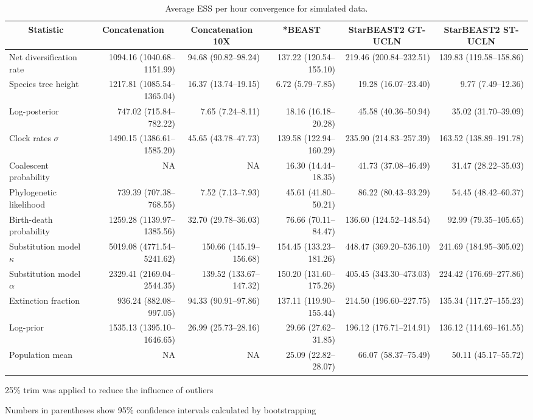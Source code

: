 \documentclass[12pt]{article}
\begin{document}
\begin{landscape}
\begin{table}[htb!]
\centering
\caption{Average ESS per hour convergence for simulated data.}
\label{tab:simulatedPerHour}
\begin{threeparttable}
\begin{adjustbox}{center}
\renewcommand{\arraystretch}{1.2}
\scriptsize
\begin{tabular}{|l|r|r|r|r|r|}
\multicolumn{1}{c}{Statistic} & \multicolumn{1}{c}{Concatenation} & \multicolumn{1}{c}{Concatenation 10X} & \multicolumn{1}{c}{*BEAST} & \multicolumn{1}{c}{StarBEAST2 GT-UCLN} & \multicolumn{1}{c}{StarBEAST2 ST-UCLN}\tabularnewline
\hline
Net diversification rate & 1094.16 (1040.68--1151.99) & 94.68 (90.82--98.24) & 137.22 (120.54--155.10) & 219.46 (200.84--232.51) & 139.83 (119.58--158.86)\tabularnewline
\hline
Species tree height & 1217.81 (1085.54--1365.04) & 16.37 (13.74--19.15) & 6.72 (5.79--7.85) & 19.28 (16.07--23.40) & 9.77 (7.49--12.36)\tabularnewline
\hline
Log-posterior & 747.02 (715.84--782.22) & 7.65 (7.24--8.11) & 18.16 (16.18--20.28) & 45.58 (40.36--50.94) & 35.02 (31.70--39.09)\tabularnewline
\hline
Clock rates $\sigma$ & 1490.15 (1386.61--1585.20) & 45.65 (43.78--47.73) & 139.58 (122.94--160.29) & 235.90 (214.83--257.39) & 163.52 (138.89--191.78)\tabularnewline
\hline
Coalescent probability & NA & NA & 16.30 (14.44--18.35) & 41.73 (37.08--46.49) & 31.47 (28.22--35.03)\tabularnewline
\hline
Phylogenetic likelihood & 739.39 (707.38--768.55) & 7.52 (7.13--7.93) & 45.61 (41.80--50.21) & 86.22 (80.43--93.29) & 54.45 (48.42--60.37)\tabularnewline
\hline
Birth-death probability & 1259.28 (1139.97--1385.56) & 32.70 (29.78--36.03) & 76.66 (70.11--84.47) & 136.60 (124.52--148.54) & 92.99 (79.35--105.65)\tabularnewline
\hline
Substitution model $\kappa$ & 5019.08 (4771.54--5241.62) & 150.66 (145.19--156.68) & 154.45 (133.23--181.26) & 448.47 (369.20--536.10) & 241.69 (184.95--305.02)\tabularnewline
\hline
Substitution model $\alpha$ & 2329.41 (2169.04--2544.35) & 139.52 (133.67--147.32) & 150.20 (131.60--175.26) & 405.45 (343.30--473.03) & 224.42 (176.69--277.86)\tabularnewline
\hline
Extinction fraction & 936.24 (882.08--997.05) & 94.33 (90.91--97.86) & 137.11 (119.90--155.44) & 214.50 (196.60--227.75) & 135.34 (117.27--155.23)\tabularnewline
\hline
Log-prior & 1535.13 (1395.10--1646.65) & 26.99 (25.73--28.16) & 29.66 (27.62--31.85) & 196.12 (176.71--214.91) & 136.12 (114.69--161.55)\tabularnewline
\hline
Population mean & NA & NA & 25.09 (22.82--28.07) & 66.07 (58.37--75.49) & 50.11 (45.17--55.72)\tabularnewline
\hline
\end{tabular}
\end{adjustbox}
\begin{tablenotes}
\scriptsize
\item 25\% trim was applied to reduce the influence of outliers
\item Numbers in parentheses show 95\% confidence intervals calculated by bootstrapping
\end{tablenotes}
\end{threeparttable}
\end{table}


\end{landscape}
\end{document}
